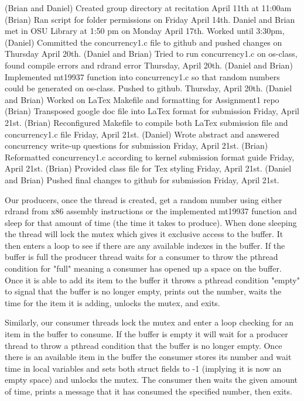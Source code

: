 \documentclass[10pt,letterpaper,draftclsnofoot,onecolumn]{IEEEtran}
\begin{document}
\noindent (Brian and Daniel) Created group directory at recitation April 11th at 11:00am
(Brian) Ran script for folder permissions on Friday April 14th.
Daniel and Brian met in OSU Library at 1:50 pm on Monday April 17th. Worked until 3:30pm, 
(Daniel) Committed the concurrency1.c file to github and pushed changes on Thursday April 20th.
(Daniel and Brian) Tried to run concurrency1.c on os-class, found compile errors and rdrand error Thursday, April 20th.
(Daniel and Brian) Implemented mt19937 function into concurrency1.c so that random numbers could be generated on os-class. Pushed to github. Thursday, April 20th.
(Daniel and Brian) Worked on LaTex Makefile and formatting for Assignment1 repo
(Brian) Transposed google doc file into LaTex format for submission Friday, April 21st.
(Brian) Reconfigured Makefile to compile both LaTex submission file and concurrency1.c file Friday, April 21st.
(Daniel) Wrote abstract and answered concurrency write-up questions for submission Friday, April 21st.
(Brian) Reformatted concurrency1.c according to kernel submission format guide Friday, April 21st.
(Brian) Provided class file for Tex styling Friday, April 21st.
(Daniel and Brian) Pushed final changes to github for submission Friday, April 21st.


\medskip

\medskip

\noindent Our producers, once the thread is created, get a random number using either rdrand from x86 assembly instructions or the implemented mt19937 function and sleep for that amount of time (the time it takes to produce). When done sleeping the thread will lock the mutex which gives it exclusive access to the buffer. It then enters a loop to see if there are any available indexes in the buffer. If the buffer is full the producer thread waits for a consumer to throw the pthread condition for "full" meaning a consumer has opened up a space on the buffer. Once it is able to add its item to the buffer it throws a pthread condition "empty" to signal that the buffer is no longer empty, prints out the number, waits the time for the item it is adding, unlocks the mutex, and exits.\par
\medskip

\medskip

\noindent Similarly, our consumer threads lock the mutex and enter a loop checking for an item in the buffer to consume. If the buffer is empty it will wait for a producer thread to throw a pthread condition that the buffer is no longer empty. Once there is an available item in the buffer the consumer stores its number and wait time in local variables and sets both struct fields to -1 (implying it is now an empty space) and unlocks the mutex. The consumer then waits the given amount of time, prints a message that it has consumed the specified number, then exits.\par
\medskip
\end{document}
